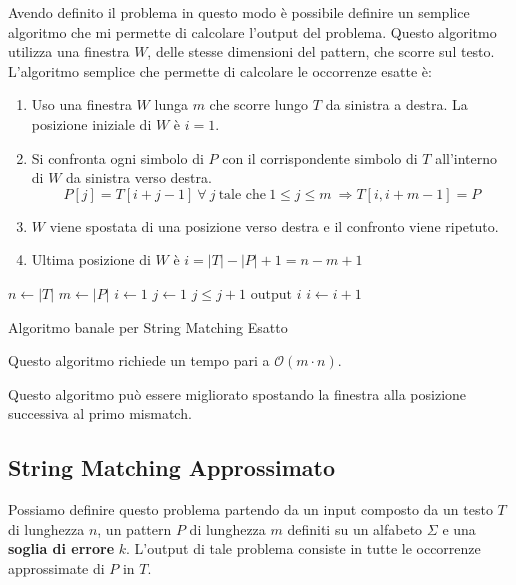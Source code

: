 Avendo definito il problema in questo modo è possibile definire un semplice
algoritmo che mi permette di calcolare l'output del problema. Questo algoritmo
utilizza una finestra $W$, delle stesse dimensioni del pattern, che scorre sul
testo. L'algoritmo semplice che permette di calcolare le occorrenze esatte è:
\begin{enumerate}
    \item Uso una finestra $W$ lunga $m$ che scorre lungo $T$ da sinistra a
          destra. La posizione iniziale di $W$ è $i = 1$.
    \item Si confronta ogni simbolo di $P$ con il corrispondente simbolo di $T$
          all'interno di $W$ da sinistra verso destra.
          \begin{equation}
              P[j] = T[i + j - 1] \ \forall \ j \ \text{tale che} \ 1 \leq j \leq m \ \Rightarrow T[i, i + m - 1] = P
          \end{equation}
    \item $W$ viene spostata di una posizione verso destra e il confronto viene ripetuto.
    \item Ultima posizione di $W$ è $i = |T| - |P| + 1 = n - m + 1$
\end{enumerate}
\begin{algorithm}
    \begin{algorithmic}
        \State $n\gets |T|$
        \State $m \gets |P|$
        \State $i\gets 1$
        \State $j \gets 1$
        \State $j \leq j + 1$
        \EndWhile
        \State $\text{output } i$
        \EndIf
        \State $i \gets i + 1$
        \EndWhile
        \EndFunction
    \end{algorithmic}
    \caption{Algoritmo banale per String Matching Esatto}
\end{algorithm}

Questo algoritmo richiede un tempo pari a $\mathcal{O}(m \cdot n)$.
\begin{nota}
    Questo algoritmo può essere migliorato spostando la finestra alla posizione
    successiva al primo mismatch.
\end{nota}
\subsection{String Matching Approssimato}
Possiamo definire questo problema partendo da un input composto da un testo $T$ di
lunghezza $n$, un pattern $P$ di lunghezza $m$ definiti su un alfabeto $\Sigma$
e una \textbf{soglia di errore} $k$. L'output di tale problema consiste in tutte
le occorrenze approssimate di $P$ in $T$.

